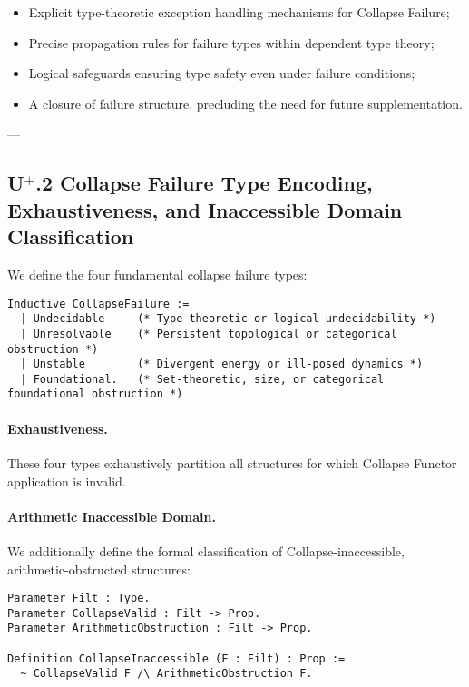 \documentclass[11pt]{article}
\begin{document}
\begin{itemize}
    \item Explicit type-theoretic exception handling mechanisms for Collapse Failure;
    \item Precise propagation rules for failure types within dependent type theory;
    \item Logical safeguards ensuring type safety even under failure conditions;
    \item A closure of failure structure, precluding the need for future supplementation.
\end{itemize}

---

\subsection*{U$^{+}$.2 Collapse Failure Type Encoding, Exhaustiveness, and Inaccessible Domain Classification}

We define the four fundamental collapse failure types:

\begin{lstlisting}[language=Coq]
Inductive CollapseFailure :=
  | Undecidable     (* Type-theoretic or logical undecidability *)
  | Unresolvable    (* Persistent topological or categorical obstruction *)
  | Unstable        (* Divergent energy or ill-posed dynamics *)
  | Foundational.   (* Set-theoretic, size, or categorical foundational obstruction *)
\end{lstlisting}

\paragraph{Exhaustiveness.} These four types exhaustively partition all structures for which Collapse Functor application is invalid.

\paragraph{Arithmetic Inaccessible Domain.} We additionally define the formal classification of Collapse-inaccessible, arithmetic-obstructed structures:

\begin{lstlisting}[language=Coq]
Parameter Filt : Type.
Parameter CollapseValid : Filt -> Prop.
Parameter ArithmeticObstruction : Filt -> Prop.

Definition CollapseInaccessible (F : Filt) : Prop :=
  ~ CollapseValid F /\ ArithmeticObstruction F.
\end{lstlisting}
\end{document}
